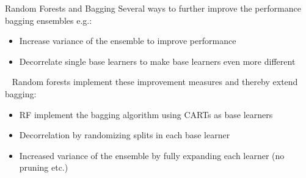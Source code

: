 \begin{vbframe}{Random Forests and Bagging}
Several ways to further improve the performance bagging ensembles e.g.: 
\begin{itemize}
  \item Increase variance of the ensemble to improve performance
  \item Decorrelate single base learners to make base learners even more different
\end{itemize} 
\ \newline
Random forests implement these improvement measures and thereby extend bagging:
\begin{itemize}
  \item RF implement the bagging algorithm using CARTs as base learners
  \item Decorrelation by randomizing splits in each base learner
  \item Increased variance of the ensemble by fully expanding each learner (no pruning etc.)
\end{itemize}
\end{vbframe}


